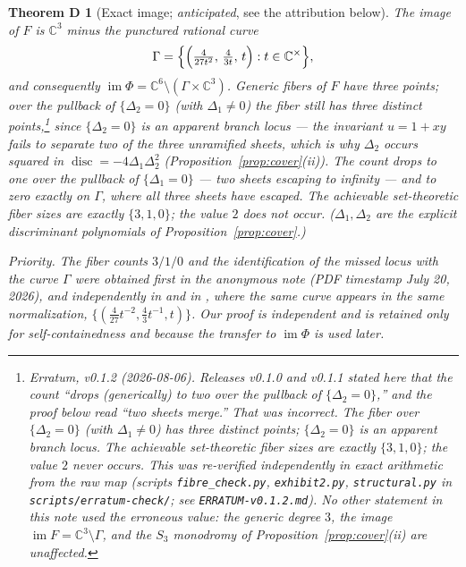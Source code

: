\documentclass[11pt]{amsart}
\newcommand{\CC}{\mathbb{C}}
\newcommand{\Cstar}{\CC^{\times}}
\newcommand{\im}{\operatorname{im}}
\newcommand{\disc}{\operatorname{disc}}
\theoremstyle{plain}
\newtheorem*{thmD}{Theorem D}
\theoremstyle{definition}
\theoremstyle{remark}
\begin{document}
\begin{thmD}[Exact image; \emph{anticipated}, see the attribution below]
The image of $F$ is $\CC^{3}$ minus the punctured rational curve
\[
\Gamma=\Bigl\{\Bigl(\tfrac{4}{27t^{2}},\,\tfrac{4}{3t},\,t\Bigr):
t\in\Cstar\Bigr\},
\]
and consequently $\im\Phi=\CC^{6}\setminus(\Gamma\times\CC^{3})$. Generic
fibers of $F$ have three points; over the pullback of $\{\Delta_{2}=0\}$
(with $\Delta_{1}\neq0$) the fiber still has three \emph{distinct}
points,\footnote{\emph{Erratum, v0.1.2 (2026-08-06).} Releases v0.1.0 and
v0.1.1 stated here that the count ``drops (generically) to two over the
pullback of $\{\Delta_{2}=0\}$,'' and the proof below read ``two sheets
merge.'' That was incorrect. The fiber over $\{\Delta_{2}=0\}$ (with
$\Delta_{1}\neq0$) has three distinct points; $\{\Delta_{2}=0\}$ is an
apparent branch locus. The achievable set-theoretic fiber sizes are exactly
$\{3,1,0\}$; the value $2$ never occurs. This was re-verified independently
in exact arithmetic from the raw map (scripts
\texttt{fibre\_check.py}, \texttt{exhibit2.py}, \texttt{structural.py} in
\texttt{scripts/erratum-check/}; see \texttt{ERRATUM-v0.1.2.md}). No other
statement in this note used the erroneous value: the generic degree $3$, the
image $\im F=\CC^{3}\setminus\Gamma$, and the $S_{3}$ monodromy of
Proposition~\ref{prop:cover}(ii) are unaffected.} since
$\{\Delta_{2}=0\}$ is an \emph{apparent} branch locus --- the invariant
$u=1+xy$ fails to separate two of the three unramified sheets, which is why
$\Delta_{2}$ occurs squared in $\disc=-4\Delta_{1}\Delta_{2}^{2}$
(Proposition~\ref{prop:cover}(ii)). The count drops to one over the pullback
of $\{\Delta_{1}=0\}$ --- two sheets escaping to infinity --- and to zero
exactly on $\Gamma$, where all three sheets have escaped. The achievable
set-theoretic fiber sizes are exactly $\{3,1,0\}$; the value $2$ does not
occur. ($\Delta_{1},\Delta_{2}$ are the explicit discriminant polynomials of
Proposition~\ref{prop:cover}.)

\emph{Priority.} The fiber counts $3/1/0$ and the identification of the
missed locus with the curve $\Gamma$ were obtained first in the anonymous
note \cite[Thm.~4.2]{Ulam26} (PDF timestamp July 20, 2026), and
independently in \cite[\S4.3]{Mayner26} and in \cite[Prop.~5.1]{Shaska26},
where the same curve appears in the same normalization,
$\{(\tfrac{4}{27}t^{-2},\tfrac43 t^{-1},t)\}$. Our proof is independent
and is retained only for self-containedness and because the transfer to
$\im\Phi$ is used later.
\end{thmD}
\end{document}
